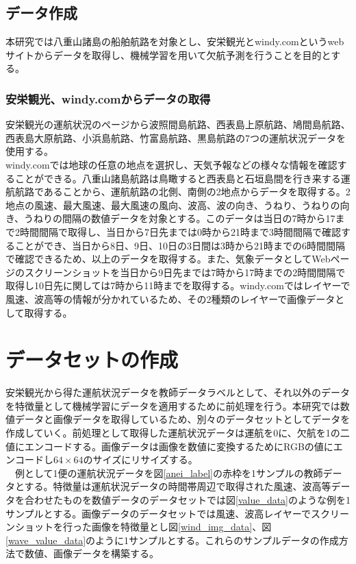 \documentclass[twocolumn,twoside,9.5pt]{jsarticle}
\begin{document}
\subsection{データ作成}
本研究では八重山諸島の船舶航路を対象とし、安栄観光\cite{anei}とwindy.com\cite{windy}というwebサイトからデータを取得し、機械学習を用いて欠航予測を行うことを目的とする。
\subsubsection{安栄観光、windy.comからデータの取得}
安栄観光\cite{anei}の運航状況のページから波照間島航路、西表島上原航路、鳩間島航路、西表島大原航路、小浜島航路、竹富島航路、黒島航路の7つの運航状況データを使用する。
\\windy.com\cite{windy}では地球の任意の地点を選択し、天気予報などの様々な情報を確認することができる。八重山諸島航路は鳥瞰すると西表島と石垣島間を行き来する運航航路であることから、運航航路の北側、南側の2地点からデータを取得する。2地点の風速、最大風速、最大風速の風向、波高、波の向き、うねり、うねりの向き、うねりの間隔の数値データを対象とする。このデータは当日の7時から17まで2時間間隔で取得し、当日から7日先までは0時から21時まで3時間間隔で確認することができ、当日から8日、9日、10日の3日間は3時から21時までの6時間間隔で確認できるため、以上のデータを取得する。また、気象データとしてWebページのスクリーンショットを当日から9日先までは7時から17時までの2時間間隔で取得し10日先に関しては7時から11時までを取得する。windy.com\cite{windy}ではレイヤーで風速、波高等の情報が分かれているため、その2種類のレイヤーで画像データとして取得する。

\section{データセットの作成}
安栄観光\cite{anei}から得た運航状況データを教師データラベルとして、それ以外のデータを特徴量として機械学習にデータを適用するために前処理を行う。本研究では数値データと画像データを取得しているため、別々のデータセットとしてデータを作成していく。前処理として取得した運航状況データは運航を0に、欠航を1の二値にエンコードする。画像データは画像を数値に変換するためにRGBの値にエンコードし$64\times64$のサイズにリサイズする。
\\　例として1便の運航状況データを図\ref{anei_label}の赤枠を1サンプルの教師データとする。特徴量は運航状況データの時間帯周辺で取得された風速、波高等データを合わせたものを数値データのデータセットでは図\ref{value_data}のような例を1サンプルとする。画像データのデータセットでは風速、波高レイヤーでスクリーンショットを行った画像を特徴量とし図\ref{wind_img_data}、図\ref{wave_value_data}のように1サンプルとする。これらのサンプルデータの作成方法で数値、画像データを構築する。
 
\end{document}
